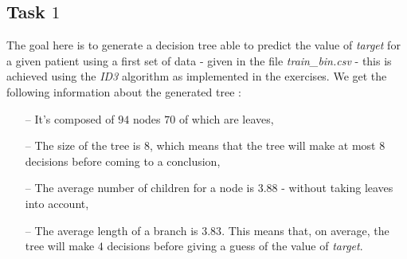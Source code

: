 \documentclass[9pt]{extarticle}
\DeclarePairedDelimiter\ceil{\lceil}{\rceil}
\begin{document}
\subsection{Task $1$}
	The goal here is to generate a decision tree able to predict the value of \emph{target} for a given patient using a first set of data - given in the file \emph{train\_bin.csv} - this is achieved using the \emph{ID3} algorithm as implemented in the exercises. We get the following information about the generated tree :
	\begin{itemize}[topsep=0pt,itemsep=0pt,partopsep=0pt, parsep=0pt]
		\item[--] It's composed of $94$ nodes $70$ of which are leaves,
		\item[--] The size of the tree is 8, which means that the tree will make at most $8$ decisions before coming to a conclusion,
		\item[--] The average number of children for a node is $3.88$ - without taking leaves into account,
		\item[--] The average length of a branch is $3.83$.  This means that, on average, the tree will make $4$ decisions before giving a guess of the value of \emph{target}.
	\end{itemize}
\end{document}
